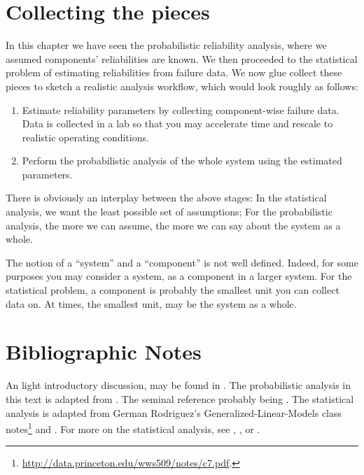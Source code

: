 \section{Collecting the pieces}
In this chapter we have seen the probabilistic reliability analysis, where we assumed components' reliabilities are known. 
We then proceeded to the statistical problem of estimating reliabilities from failure data.
We now glue collect these pieces to sketch a realistic analysis workflow, which would look roughly as follows:
\begin{enumerate}
\item Estimate reliability parameters by collecting component-wise failure data. Data is collected in a lab so that you may accelerate time and rescale to realistic operating conditions.
\item Perform the probabilistic analysis of the whole system using the estimated parameters.
\end{enumerate}



\begin{remark}
There is obviously an interplay between the above stages:
In the statistical analysis, we want the least possible set of assumptions;
For the probabilistic analysis, the more we can assume, the more we can say about the system as a whole.
\end{remark}

\begin{remark}
The notion of a ``system'' and a ``component'' is not well defined.
Indeed, for some purposes you may consider a system, as a component in a larger system.
For the statistical problem, a component is probably the smallest unit you can collect data on. At times, the smallest unit, may be the system as a whole.
\end{remark}




\section{Bibliographic Notes}
An light introductory discussion, may be found in \cite{nahmias_production_2015}. 
The probabilistic analysis in this text is adapted from \cite{aven_stochastic_1999}.
The seminal reference probably being \cite{barlow_mathematical_1965}.
The statistical analysis is adapted from German Rodriguez's Generalized-Linear-Models class notes\footnote{\url{http://data.princeton.edu/wws509/notes/c7.pdf}.} and \cite[Ch.8]{natrella_nist/sematech_2010}.
For more on the statistical analysis, see \cite{cox_analysis_1984}, \cite{kalbfleisch_statistical_2002}, or \cite{klein_survival_2005}.


% 